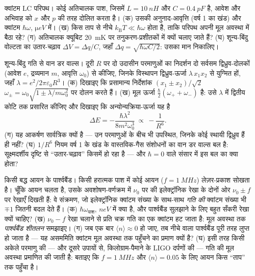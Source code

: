\begin{exercise}[$\star\star$]\label{exo:b3:harmonic-oscillator:9}
क्वांटम LC परिपथ। कोई अतिचालक पाश, जिसमें $L =
\qty{10}{nH}$ और $C = \qty{0.4}{pF}$ है, आवेश और अभिवाह को
$x$ और $p$ की तरह दोलित करता है। (क) उसकी अनुनाद-आवृत्ति (वर्ष 1 का
खंड) और क्वांटम $\hbar\omega$, $\unit{\micro eV}$ में। (ख) किस
ताप से नीचे $k_{\text{B}}T \ll \hbar\omega$ होता है, ताकि परिपथ
अपनी मूल अवस्था में बैठा रहे? (ग) अतिचालक क्यूबिट \qty{20}{mK} पर
तनुकरण-प्रशीतकों में क्यों चलाए जाते हैं? (घ) शून्य-बिंदु वोल्टता का
उतार-चढ़ाव $\Delta V = \Delta q/C$, जहाँ $\Delta q =
\sqrt{\hbar\omega C/2}$: उसका मान निकालिए।
\end{exercise}

\begin{exercise}[$\star\star\star$]\label{exo:b3:harmonic-oscillator:10}
शून्य-बिंदु गति से वान डर वाल्स। दूरी $R$ पर दो उदासीन परमाणुओं का
निदर्शन दो सर्वसम द्विध्रुव-दोलकों (आवेश $e$, द्रव्यमान
$m$, आवृत्ति $\omega_0$) से कीजिए, जिनके विस्थापन द्विध्रुव-ऊर्जा
$\lambda\,x_1x_2$ से युग्मित हों, जहाँ $\lambda = e^2/2\pi\varepsilon_0R^3$।
(क) दिखाइए कि प्रसामान्य निर्देशांक $(x_1 \pm x_2)/\sqrt2$
$\omega_\pm = \omega_0\sqrt{1 \pm \lambda/m\omega_0^2}$ पर दोलन करते हैं। (ख) मूल
ऊर्जा $\tfrac\hbar2(\omega_+ + \omega_-)$ है: उसे $\lambda$ में
द्वितीय कोटि तक प्रसारित कीजिए और दिखाइए कि अन्योन्यक्रिया-ऊर्जा यह है
\[
\Delta E = -\frac{\hbar\lambda^2}{8m^2\omega_0^3}
\ \propto\ -\frac{1}{R^6} .
\]
(ग) यह आकर्षण सार्वत्रिक क्यों है --- उन परमाणुओं के बीच भी उपस्थित,
जिनके कोई स्थायी द्विध्रुव हैं ही नहीं? (घ) $1/R^6$ नियम वर्ष 1 के
खंड के वास्तविक-गैस संशोधनों का वान डर
वाल्स बल है: सूक्ष्मदर्शीय दृष्टि से ``उतार-चढ़ाव'' किसमें हो रहा है ---
और $\hbar = 0$ वाले संसार में इस बल का क्या होता?
\end{exercise}

\begin{exercise}[$\star\star\star$]\label{exo:b3:harmonic-oscillator:11}
किसी बद्ध आयन के पार्श्वबैंड। किसी हरात्मक पाश में कोई आयन ($f =
\qty{1}{MHz}$) लेज़र-प्रकाश सोखता है। चूँकि आयन चलता है, उसके
अवशोषण-वर्णक्रम में $\nu_0$ पर की इलेक्ट्रॉनिक रेखा के दोनों ओर
$\nu_0 \pm f$ पर रेखाएँ दिखती हैं: वे संक्रमण, जो इलेक्ट्रॉनिक
क्वांटम संख्या के साथ-साथ \emph{गति की} क्वांटम संख्या भी $\mp1$ जितनी
बदल देते हैं। (क) $\hbar\omega_{\text{पाश}}$, $\unit{neV}$ में क्या है,
और पार्श्वबैंड सुलझाने के लिए बहुत सँकरी रेखा क्यों चाहिए? (ख)
$\nu_0 - f$ रेखा चलाने से प्रति चक्र गति का एक क्वांटम हट जाता है:
मूल अवस्था तक \emph{पार्श्वबैंड शीतलन} समझाइए। (ग) जब एक बार
$\langle n\rangle \approx
0$ हो जाए, तब नीचे वाला पार्श्वबैंड पूरी तरह
लुप्त हो जाता है --- यह असममिति क्वांटम मूल अवस्था तक पहुँचने का प्रमाण
क्यों है? (घ) इसी तरह किसी अकेले परमाणु की --- और दूसरे उपायों से,
किलोग्राम-पैमाने के LIGO दर्पणों की --- गति की मूल अवस्था प्रमाणित की
जाती है: बताइए कि $f = \qty{1}{MHz}$ और
$\langle n\rangle = 0.05$ के लिए आयन किस ``ताप'' तक पहुँचा है।
\end{exercise}

